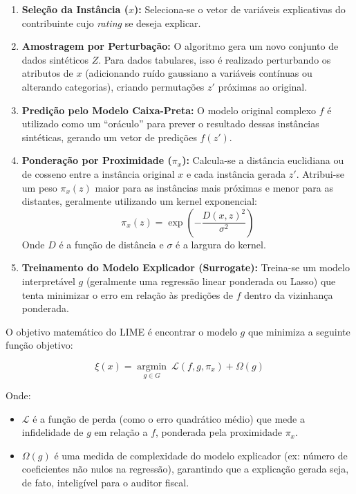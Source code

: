 \begin{enumerate}
    \item \textbf{Seleção da Instância ($x$):} Seleciona-se o vetor de variáveis explicativas do contribuinte cujo \textit{rating} se deseja explicar.
    
    \item \textbf{Amostragem por Perturbação:} O algoritmo gera um novo conjunto de dados sintéticos $Z$.  Para dados tabulares, isso é realizado perturbando os atributos de $x$ (adicionando ruído gaussiano a variáveis contínuas ou alterando categorias), criando permutações $z'$ próximas ao original. 
    
    \item \textbf{Predição pelo Modelo Caixa-Preta:} O modelo original complexo $f$ é utilizado como um ``oráculo'' para prever o resultado dessas instâncias sintéticas, gerando um vetor de predições $f(z')$.
    
    \item \textbf{Ponderação por Proximidade ($\pi_x$):} Calcula-se a distância euclidiana ou de cosseno entre a instância original $x$ e cada instância gerada $z'$. Atribui-se um peso $\pi_x(z)$ maior para as instâncias mais próximas e menor para as distantes, geralmente utilizando um kernel exponencial:
    \begin{equation}
        \pi_x(z) = \exp\left(-\frac{D(x, z)^2}{\sigma^2}\right)
    \end{equation}
    Onde $D$ é a função de distância e $\sigma$ é a largura do kernel.
    
    \item \textbf{Treinamento do Modelo Explicador (Surrogate):} Treina-se um modelo interpretável $g$ (geralmente uma regressão linear ponderada ou Lasso) que tenta minimizar o erro em relação às predições de $f$ dentro da vizinhança ponderada. 
\end{enumerate}

O objetivo matemático do LIME é encontrar o modelo $g$ que minimiza a seguinte função objetivo:

\begin{equation}
    \xi(x) = \operatorname*{argmin}_{g \in G} \ \mathcal{L}(f, g, \pi_x) + \Omega(g)
\end{equation}

Onde:
\begin{itemize}
    \item $\mathcal{L}$ é a função de perda (como o erro quadrático médio) que mede a infidelidade de $g$ em relação a $f$, ponderada pela proximidade $\pi_x$.
    \item $\Omega(g)$ é uma medida de complexidade do modelo explicador (ex: número de coeficientes não nulos na regressão), garantindo que a explicação gerada seja, de fato, inteligível para o auditor fiscal.
\end{itemize}

